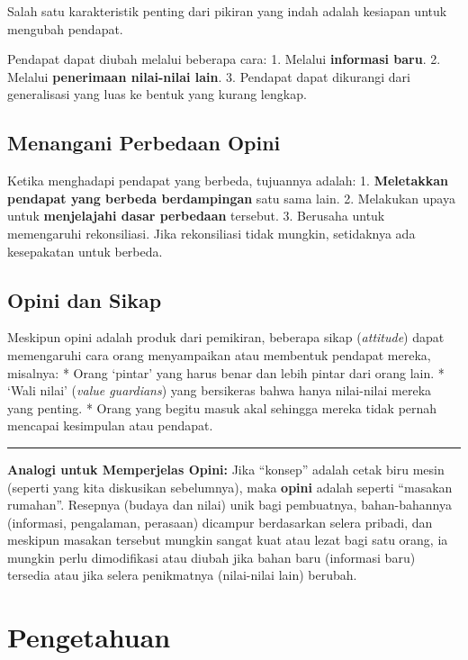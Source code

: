 \documentclass[
  letterpaper,
  DIV=11,
  numbers=noendperiod]{scrreprt}
\begin{document}
Salah satu karakteristik penting dari pikiran yang indah adalah kesiapan
untuk mengubah pendapat.

Pendapat dapat diubah melalui beberapa cara: 1. Melalui
\textbf{informasi baru}. 2. Melalui \textbf{penerimaan nilai-nilai
lain}. 3. Pendapat dapat dikurangi dari generalisasi yang luas ke bentuk
yang kurang lengkap.

\subsection{Menangani Perbedaan Opini}\label{menangani-perbedaan-opini}

Ketika menghadapi pendapat yang berbeda, tujuannya adalah: 1.
\textbf{Meletakkan pendapat yang berbeda berdampingan} satu sama lain.
2. Melakukan upaya untuk \textbf{menjelajahi dasar perbedaan} tersebut.
3. Berusaha untuk memengaruhi rekonsiliasi. Jika rekonsiliasi tidak
mungkin, setidaknya ada kesepakatan untuk berbeda.

\subsection{Opini dan Sikap}\label{opini-dan-sikap}

Meskipun opini adalah produk dari pemikiran, beberapa sikap
(\emph{attitude}) dapat memengaruhi cara orang menyampaikan atau
membentuk pendapat mereka, misalnya: * Orang `pintar' yang harus benar
dan lebih pintar dari orang lain. * `Wali nilai' (\emph{value
guardians}) yang bersikeras bahwa hanya nilai-nilai mereka yang penting.
* Orang yang begitu masuk akal sehingga mereka tidak pernah mencapai
kesimpulan atau pendapat.

\begin{center}\rule{0.5\linewidth}{0.5pt}\end{center}

\textbf{Analogi untuk Memperjelas Opini:} Jika ``konsep'' adalah cetak
biru mesin (seperti yang kita diskusikan sebelumnya), maka
\textbf{opini} adalah seperti ``masakan rumahan''. Resepnya (budaya dan
nilai) unik bagi pembuatnya, bahan-bahannya (informasi, pengalaman,
perasaan) dicampur berdasarkan selera pribadi, dan meskipun masakan
tersebut mungkin sangat kuat atau lezat bagi satu orang, ia mungkin
perlu dimodifikasi atau diubah jika bahan baru (informasi baru) tersedia
atau jika selera penikmatnya (nilai-nilai lain) berubah.

\section{Pengetahuan}\label{pengetahuan}
\end{document}
